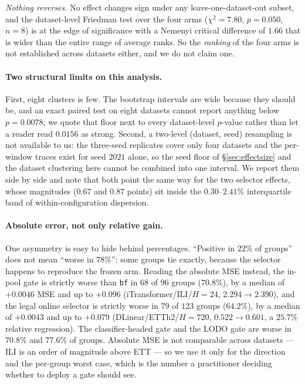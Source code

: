 \documentclass[a4paper,fleqn]{cas-sc}
\newcommand{\arm}[1]{\texttt{#1}}
\begin{document}
\emph{Nothing reverses.} No effect changes sign under any leave-one-dataset-out
subset, and the dataset-level Friedman test over the four arms
($\chi^2 = 7.80$, $p = 0.050$, $n = 8$) is at the edge of significance with a
Nemenyi critical difference of $1.66$ that is wider than the entire range of
average ranks. So the \emph{ranking} of the four arms is not established across
datasets either, and we do not claim one.

\paragraph{Two structural limits on this analysis.}
First, eight clusters is few. The bootstrap intervals are wide because they should
be, and an exact paired test on eight datasets cannot report anything below
$p = 0.0078$; we quote that floor next to every dataset-level $p$-value rather than
let a reader read $0.0156$ as strong. Second, a two-level
(dataset, seed) resampling is not available to us: the three-seed replicates cover
only four datasets and the per-window traces exist for seed $2021$ alone, so the
seed floor of \S\ref{sec:effectsize} and the dataset clustering here cannot be
combined into one interval. We report them side by side and note that both point
the same way for the two selector effects, whose magnitudes ($0.67$ and $0.87$
points) sit inside the $0.30$--$2.41\%$ interquartile band of
within-configuration dispersion.

\paragraph{Absolute error, not only relative gain.}
One asymmetry is easy to hide behind percentages. ``Positive in $22\%$ of groups''
does not mean ``worse in $78\%$'': some groups tie exactly, because the selector
happens to reproduce the frozen arm. Reading the absolute MSE instead, the in-pool
gate is strictly worse than \arm{bf} in $68$ of $96$ groups ($70.8\%$), by a median
of $+0.0046$ MSE and up to $+0.096$ (iTransformer/ILI/$H{=}24$, $2.294 \to 2.390$),
and the legal online selector is strictly worse in $79$ of $123$ groups ($64.2\%$),
by a median of $+0.0043$ and up to $+0.079$ (DLinear/ETTh2/$H{=}720$,
$0.522 \to 0.601$, a $25.7\%$ relative regression). The classifier-headed gate and
the LODO gate are worse in $70.8\%$ and $77.6\%$ of groups. Absolute MSE is not
comparable across datasets --- ILI is an order of magnitude above ETT --- so we use
it only for the direction and the per-group worst case, which is the number a
practitioner deciding whether to deploy a gate should see.
\end{document}

